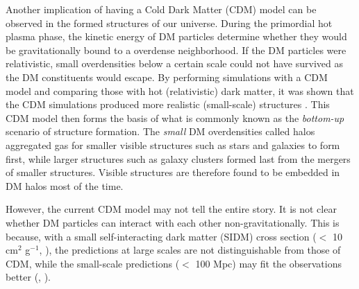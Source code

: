 
Another implication of having a Cold Dark Matter (CDM) model can be observed
in the formed structures of our universe.  
During the primordial hot plasma phase, the kinetic energy of DM particles
determine whether they would be gravitationally bound to a overdense neighborhood. 
If the DM particles were relativistic, small overdensities below a certain scale could not have
survived as the DM constituents would escape.  By performing simulations with
a CDM model and comparing those with hot (relativistic) dark matter, 
it was shown that the CDM simulations produced more realistic (small-scale) 
structures \citep{Blumenthal1984}. 
This CDM model then forms the basis of what is commonly known as the {\it bottom-up} 
scenario of structure formation. The {\it small} DM overdensities called halos aggregated 
gas for smaller visible structures such as stars and galaxies to form first,
while larger structures such as galaxy clusters formed last from the mergers 
of smaller structures. Visible structures are therefore found to be embedded
in DM halos most of the time. 

However, the current CDM model may not tell the entire story. It is not clear
whether DM particles can interact with each other non-gravitationally.  
This is because, with a small self-interacting dark matter (SIDM) cross
section ($<$ 10 cm$^2$ g$^{-1}$, \citealt{Randall2008d}), the predictions at large scales 
are not distinguishable from those
of CDM, while the small-scale predictions ($<$ 100 Mpc) may fit the observations better
(\citealt{Spergel2000}, \citealt{Kaplinghat2013}).  

